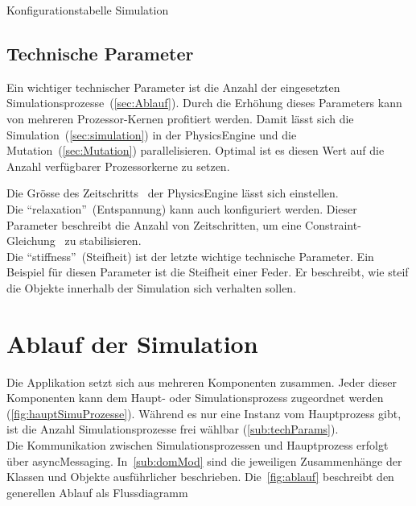     \begin{table}[H]
      
      \caption{Konfigurationstabelle Simulation\label{tbl:simulation-parameters-general}}
    \end{table}

    \subsection{Technische Parameter\label{sub:techParams}}

      Ein wichtiger technischer Parameter ist die Anzahl der eingesetzten Simulationsprozesse~(\vref{sec:Ablauf}).
      Durch die Erhöhung dieses Parameters kann von mehreren Prozessor-Kernen profitiert werden.
      Damit lässt sich die Simulation~(\vref{sec:simulation}) in der \gls{PhysicsEngine} und die Mutation~(\vref{sec:Mutation}) parallelisieren.
      Optimal ist es diesen Wert auf die Anzahl verfügbarer Prozessorkerne zu setzen.

      \medskip

      Die Grösse des Zeitschritts~\cite{bullet:steppingTheWorld} der \gls{PhysicsEngine} lässt sich einstellen.
      \\
      Die ``relaxation''~(Entspannung) kann auch konfiguriert werden.
      Dieser Parameter beschreibt die Anzahl von Zeitschritten,
      um eine Constraint-Gleichung~\cite{gamedev:constraints} zu stabilisieren.
      \\
      Die ``stiffness''~(Steifheit) ist der letzte wichtige technische Parameter.
      Ein Beispiel für diesen Parameter ist die Steifheit einer Feder.
      Er beschreibt, wie steif die Objekte innerhalb der Simulation sich verhalten sollen.

  \section{Ablauf der Simulation\label{sec:Ablauf}}

    Die Applikation setzt sich aus mehreren Komponenten zusammen.
    Jeder dieser Komponenten kann dem Haupt- oder Simulationsprozess zugeordnet werden (\vref{fig:hauptSimuProzesse}).
    Während es nur eine Instanz vom Hauptprozess gibt,
    ist die Anzahl Simulationsprozesse frei wählbar (\vref{sub:techParams}).
    \\
    Die Kommunikation zwischen Simulationsprozessen und Hauptprozess erfolgt über \gls{asyncMessaging}.
    In~\vref{sub:domMod} sind die jeweiligen Zusammenhänge der Klassen und Objekte ausführlicher beschrieben.
    Die~\vref{fig:ablauf} beschreibt den generellen Ablauf als Flussdiagramm

